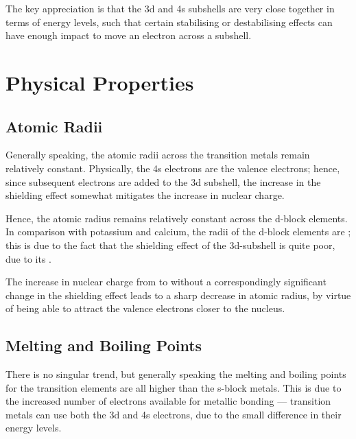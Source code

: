 				The key appreciation is that the 3d and 4s subshells are very close together in terms of energy levels, such that certain
				stabilising or destabilising effects can have enough impact to move an electron across a subshell.




	\pagebreak
	\section{Physical Properties}

		\subsection{Atomic Radii}

			Generally speaking, the atomic radii across the transition metals remain relatively constant. Physically, the 4s electrons
			are the valence electrons; hence, since subsequent electrons are added to the 3d subshell, the increase in the shielding effect
			somewhat mitigates the increase in nuclear charge.


			Hence, the atomic radius remains relatively constant across the d-block elements. In comparison with potassium and calcium,
			the radii of the d-block elements are ; this is due to the fact that the shielding effect of the 3d-subshell
			is quite poor, due to its .

			The increase in nuclear charge from  to  without a correspondingly significant change in the shielding effect
			leads to a sharp decrease in atomic radius, by virtue of being able to attract the valence electrons closer to the nucleus.



		\subsection{Melting and Boiling Points}

			There is no singular trend, but generally speaking the melting and boiling points for the transition elements are all higher
			than the s-block metals. This is due to the increased number of electrons available for metallic bonding --- transition
			metals can use both the 3d and 4s electrons, due to the small difference in their energy levels.

